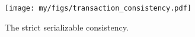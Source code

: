 



\hspace*{\fill}

\noindent{}

\begin{figure}[t]
  \texttt{[image: my/figs/transaction\_consistency.pdf]}
  \caption{The strict serializable consistency. }
  \label{fig:txn_consistency}
\end{figure}





